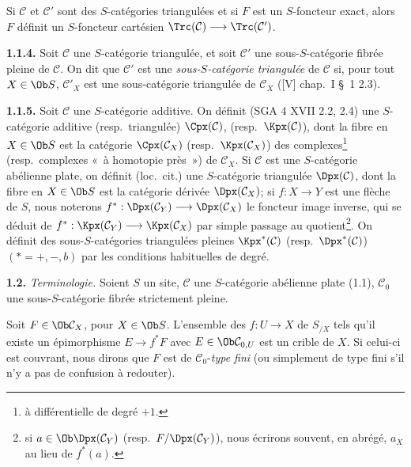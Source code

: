 Si \(\mathcal C\) et \(\mathcal C'\)
sont des \(S\)-catégories triangulées et si \(F\) est un \(S\)-foncteur exact, alors \(F\) définit un \(S\)-foncteur cartésien \(\Trc(\mathcal C)\longrightarrow \Trc(\mathcal C')\).

\textbf{1.1.4.} Soit \(\mathcal C\) une \(S\)-catégorie triangulée, et soit \(\mathcal C'\) une sous-\(S\)-catégorie fibrée pleine de \(\mathcal C\). On dit que \(\mathcal C'\) est une \emph{sous-\(S\)-catégorie triangulée} de \(\mathcal C\) si, pour tout \(X\in\Ob S\), \(\mathcal C'_X\) est une sous-catégorie triangulée de \(\mathcal C_X\) ([V] chap.\ I \S~1 2.3).

\textbf{1.1.5.} Soit \(\mathcal C\) une \(S\)-catégorie additive. On définit (SGA 4 XVII 2.2, 2.4) une \(S\)-catégorie additive (resp.\ triangulée) \(\Cpx(\mathcal C)\), (resp.\ \(\Kpx(\mathcal C)\)), dont la fibre en \(X\in\Ob S\) est la catégorie \(\Cpx(\mathcal C_X)\) (resp.\ \(\Kpx(\mathcal C_X)\)) des complexes\footnote{à différentielle de degré \(+1\).} (resp.\ complexes «~à homotopie près~») de \(\mathcal C_X\). Si \(\mathcal C\) est une \(S\)-catégorie abélienne plate, on définit (loc.\ cit.) une \(S\)-catégorie triangulée \(\Dpx(\mathcal C)\), dont la fibre en \(X\in\Ob S\) est la catégorie dérivée \(\Dpx(\mathcal C_X)\); si \(f:X\to Y\) est une flèche de \(S\), nous noterons \(f^*:\Dpx(\mathcal C_Y)\longrightarrow \Dpx(\mathcal C_X)\) le foncteur image inverse, qui se déduit de \(f^*:\Kpx(\mathcal C_Y)\longrightarrow \Kpx(\mathcal C_X)\) par simple passage au quotient\footnote{si \(a\in\Ob \Dpx(\mathcal C_Y)\) (resp.\ \(F/\Dpx(\mathcal C_Y)\)), nous écrirons souvent, en abrégé, \(a_X\) au lieu de \(f^*(a)\).}. On définit des sous-\(S\)-catégories triangulées pleines \(\Kpx^*(\mathcal C)\) (resp.\ \(\Dpx^*(\mathcal C)\)) \((*=+,-,b)\) par les conditions habituelles de degré.

\textbf{1.2.} \emph{Terminologie.} Soient \(S\) un site, \(\mathcal C\) une \(S\)-catégorie abélienne plate (1.1), \(\mathcal C_0\) une sous-\(S\)-catégorie fibrée strictement pleine.

Soit \(F\in\Ob\mathcal C_X\), pour \(X\in\Ob S\). L'ensemble des \(f:U\to X\) de \(S_{/X}\) tels qu'il existe un épimorphisme \(E\longrightarrow f^*F\) avec \(E\in\Ob\mathcal C_{0,U}\) est un crible de \(X\). Si celui-ci est couvrant, nous dirons que \(F\) est de \(\mathcal C_0\)-\emph{type fini} (ou simplement de type fini s'il n'y a pas de confusion à redouter).

